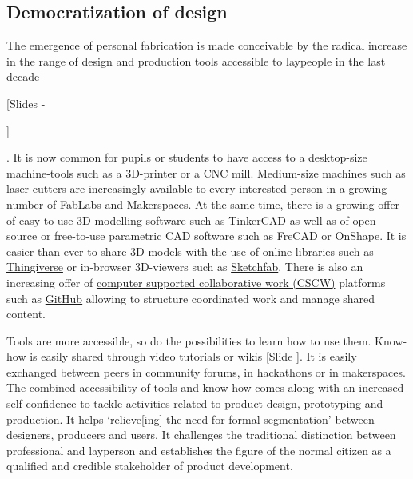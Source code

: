 \documentclass{article}
\newcounter{slide}
\begin{document}
\subsection{Democratization of design}
\label{sec:democratizationofdesign}
The emergence of personal fabrication is made conceivable by the radical increase in the range of design and production tools accessible to laypeople in the last decade {\color{blue}[Slides -\addtocounter{slide}{5}]}. It is now common for pupils or students to have access to a desktop-size machine-tools such as a 3D-printer or a CNC mill. Medium-size machines such as laser cutters are increasingly available to every interested person in a growing number of FabLabs and Makerspaces. At the same time, there is a growing offer of easy to use 3D-modelling software such as \href{https://www.tinkercad.com/}{TinkerCAD} as well as of open source or free-to-use parametric CAD software such as \href{https://www.freecadweb.org/}{FreCAD} or \href{https://www.onshape.com/}{OnShape}. It is easier than ever to share 3D-models with the use of online libraries such as \href{https://www.thingiverse.com/}{Thingiverse} or in-browser 3D-viewers such as \href{https://sketchfab.com/}{Sketchfab}. There is also an increasing offer of \href{https://en.wikipedia.org/wiki/Computer-supported_cooperative_work}{computer supported collaborative work (CSCW)} platforms such as \href{https://github.com/}{GitHub} allowing to structure coordinated work and manage shared content. 

Tools are more accessible, so do the possibilities to learn how to use them. Know-how is easily shared through video tutorials or wikis {\color{blue}[Slide ]}. It is easily exchanged between peers in community forums, in hackathons or in makerspaces. The combined accessibility of tools and know-how comes along with an increased self-confidence to tackle activities related to product design, prototyping and production. It helps `relieve[ing] the need for formal segmentation' \cite{chenDirectDigitalManufacturing2015a} between designers, producers and users. It challenges the traditional distinction between professional and layperson and establishes the figure of the normal citizen as a qualified and credible stakeholder of product development.
\end{document}

